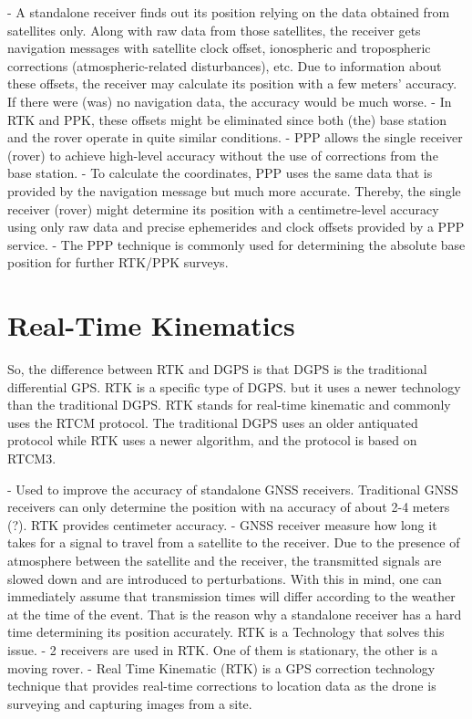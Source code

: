 - A standalone receiver finds out its position relying on the data obtained from satellites only. Along with raw data from those satellites, the receiver gets navigation messages with satellite clock offset, ionospheric and tropospheric corrections (atmospheric-related disturbances), etc. Due to information about these offsets, the receiver may calculate its position with a few meters' accuracy. If there were (was) no navigation data, the accuracy would be much worse.
- In RTK and PPK, these offsets might be eliminated since both (the) base station and the rover operate in quite similar conditions.
- PPP allows the single receiver (rover) to achieve high-level accuracy without the use of corrections from the base station.
- To calculate the coordinates, PPP uses the same data that is provided by the navigation message but much more accurate. Thereby, the single receiver (rover) might determine its position with a centimetre-level accuracy using only raw data and precise ephemerides and clock offsets provided by a PPP service.
- The PPP technique is commonly used for determining the absolute base position for further RTK/PPK surveys.

\section{Real-Time Kinematics}\label{sec:II_rtk}

So, the difference between RTK and DGPS is that DGPS is the traditional differential GPS.
RTK is a specific type of DGPS.
but it uses a newer technology than the traditional DGPS.
RTK stands for real-time kinematic and commonly uses the RTCM protocol.
The traditional DGPS uses an older antiquated protocol while RTK uses a newer algorithm, and the protocol is based on RTCM3. 

- Used to improve the accuracy of standalone GNSS receivers. Traditional GNSS receivers can only determine the position with na accuracy of about 2-4 meters (?). RTK provides centimeter accuracy.
- GNSS receiver measure how long it takes for a signal to travel from a satellite to the receiver. Due to the presence of atmosphere between the satellite and the receiver, the transmitted signals are slowed down and are introduced to perturbations. With this in mind, one can immediately assume that transmission times will differ according to the weather at the time of the event. That is the reason why a standalone receiver has a hard time determining its position accurately. RTK is a Technology that solves this issue.
- 2 receivers are used in RTK. One of them is stationary, the other is a moving rover.
- Real Time Kinematic (RTK) is a GPS correction technology technique that provides real-time corrections to location data as the drone is surveying and capturing images from a site.

